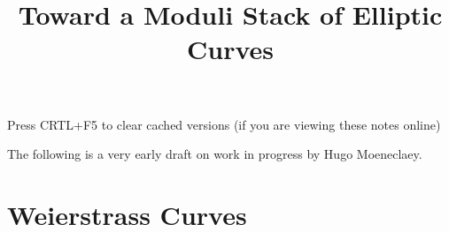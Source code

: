 \documentclass{../util/zariski}
\title{Toward a Moduli Stack of Elliptic Curves}
\begin{document}
\maketitle

\begin{center}
  \color{purple}
  \large{Press CRTL+F5 to clear cached versions}
  \large{(if you are viewing these notes online)}
\end{center}

The following is a very early draft on work in progress by Hugo Moeneclaey.

\tableofcontents

\section{Weierstrass Curves}


\printindex

\printbibliography
\end{document}
